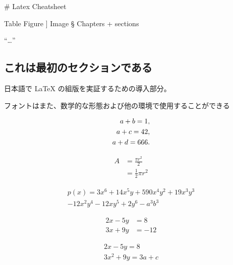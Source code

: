 # Latex Cheatsheet


 Table
 Figure
] Image
§ Chapters + sections


``\ldots''

\grule{}




\usepackage{CJKutf8}

\begin{CJK}{UTF8}{min}
\section{これは最初のセクションである}
日本語で \LaTeX{} の組版を実証するための導入部分。

フォントはまた、数学的な形態および他の環境で使用することができる
\end{CJK}

\begin{align}
a + b = 1, \notag \\
a + c = 42, \notag \\
a + d = 666. \label{all}
\end{align}

\begin{equation} \label{eq1}
\begin{split}
A & = \frac{\pi r^2}{2} \\
 & = \frac{1}{2} \pi r^2
\end{split}
\end{equation}

\begin{multline*}
p(x) = 3x^6 + 14x^5y + 590x^4y^2 + 19x^3y^3\\
- 12x^2y^4 - 12xy^5 + 2y^6 - a^3b^3
\end{multline*}

\begin{align*}
2x - 5y &=  8 \\
3x + 9y &=  -12
\end{align*}

\begin{gather*}
2x - 5y =  8 \\
3x^2 + 9y =  3a + c
\end{gather*}

